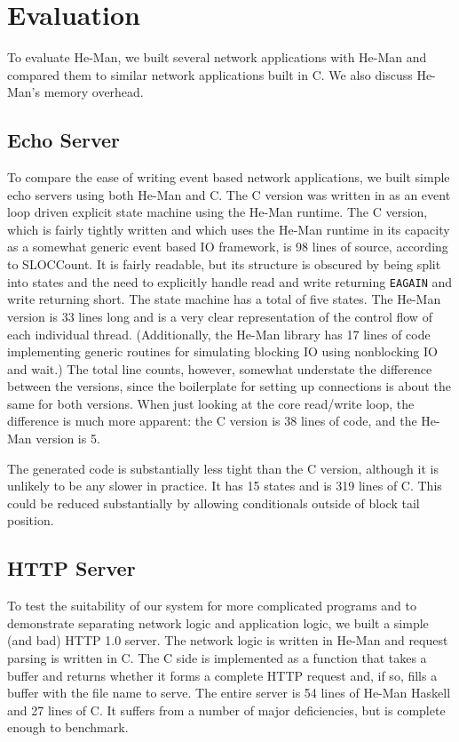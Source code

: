 \documentclass[preprint,10pt]{sigplanconf}
\renewcommand{\t}{\texttt}
\begin{document}
\section{Evaluation}\label{sec:evaluation}

To evaluate He-Man, we built several network applications with He-Man
and compared them to similar network applications built in C.  We also
discuss He-Man's memory overhead.

\subsection{Echo Server}

To compare the ease of writing event based network applications, we
built simple echo servers using both He-Man and C. The C version was
written in as an event loop driven explicit state machine using the
He-Man runtime. The C version, which is fairly tightly written and
which uses the He-Man runtime in its capacity as a somewhat generic
event based IO framework, is 98 lines of source, according to
SLOCCount. It is fairly readable, but its structure is obscured by
being split into states and the need to explicitly handle read and
write returning \t{EAGAIN} and write returning short. The state
machine has a total of five states. The He-Man version is 33 lines
long and is a very clear representation of the control flow of each
individual thread. (Additionally, the He-Man library has 17 lines of
code implementing generic routines for simulating blocking IO using
nonblocking IO and wait.) The total line counts, however, somewhat
understate the difference between the versions, since the boilerplate
for setting up connections is about the same for both versions. When
just looking at the core read/write loop, the difference is much more
apparent: the C version is 38 lines of code, and the He-Man version is
5.

The generated code is substantially less tight than the C version,
although it is unlikely to be any slower in practice. It has 15 states
and is 319 lines of C. This could be reduced substantially by allowing
conditionals outside of block tail position.

\subsection{HTTP Server}

To test the suitability of our system for more complicated programs
and to demonstrate separating network logic and application logic, we
built a simple (and bad) HTTP 1.0 server. The network logic is written
in He-Man and request parsing is written in C. The C side is
implemented as a function that takes a buffer and returns whether it
forms a complete HTTP request and, if so, fills a buffer with the
file name to serve. The entire server is 54 lines of He-Man Haskell and
27 lines of C. It suffers from a number of major deficiencies, but is
complete enough to benchmark.
\end{document}
